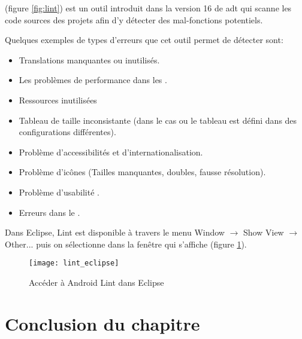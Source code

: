 \android{}  (figure \ref{fig:lint}) est un outil introduit dans la version 16 de \gls{adt} qui scanne les code sources des projets \android{} afin d'y détecter des mal-fonctions potentiels.

Quelques exemples de types d'erreurs que cet outil permet de détecter sont:

\begin{itemize}

\item Translations manquantes ou inutilisés.

\item Les problèmes de performance dans les .

\item Ressources inutilisées

\item Tableau de taille inconsistante (dans le cas ou le tableau est défini dans des configurations différentes).

\item Problème d'accessibilités et d'internationalisation.

\item Problème d'icônes (Tailles manquantes, doubles, fausse résolution).

\item Problème d'usabilité .

\item Erreurs dans le .

\end{itemize}

Dans Eclipse, \android{} Lint est disponible à travers le menu Window $\rightarrow$ Show View $\rightarrow$ Other... puis on sélectionne  dans la fenêtre qui s'affiche (figure \ref{fig:lint_eclipse}).

\begin{figure}
\center
\texttt{[image: lint\_eclipse]}
\caption{Accéder à Android Lint dans Eclipse}
\label{fig:lint_eclipse}
\end{figure}

\section{Conclusion du chapitre}
